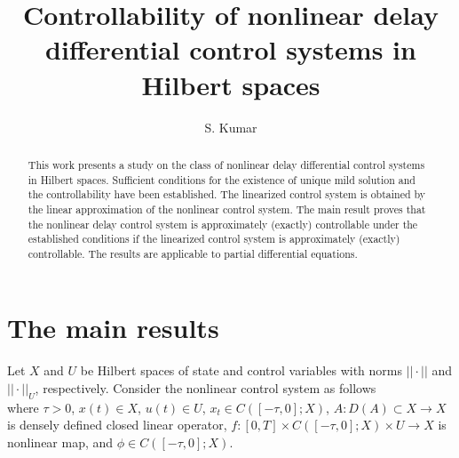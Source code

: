 \documentclass[12pt]{llncs}
\begin{document}
\fi

\newtheorem{asmp}{Assumption}

\title{Controllability of nonlinear delay differential control systems in Hilbert spaces}

\author{S. Kumar }

\maketitle

\begin{abstract}
This work presents a study on the class of nonlinear delay differential control systems in Hilbert spaces. Sufficient conditions for the existence of unique mild solution and the controllability have been established. The linearized control system is obtained by the linear approximation of the nonlinear control system. The main result proves that the nonlinear delay control system is approximately (exactly) controllable under the established conditions if the linearized control system is approximately (exactly) controllable. The results are applicable to partial differential equations.
%


\end{abstract}


\section{The main results}

Let $X$ and $U$ be Hilbert spaces of state and control variables with norms $||\cdot||$ and $||\cdot||_U$, respectively. Consider the nonlinear control system as follows
\begin{subequations}\label{eqn-main-nls-main}
\end{subequations}
where $\tau>0$, $x(t) \in X$, $u(t) \in U$, $x_t \in C([-\tau,0];X)$, $A : D(A) \subset X \rightarrow X$ is densely defined closed linear operator, $f: [0,T] \times C([-\tau,0];X) \times U \rightarrow X$ is nonlinear map, and $\phi \in C([-\tau,0];X)$.
\end{document}
